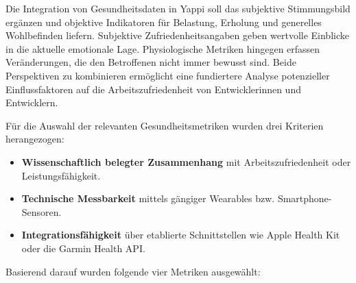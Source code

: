\documentclass[12pt,a4paper]{report}
\begin{document}
Die Integration von Gesundheitsdaten in Yappi soll das subjektive Stimmungsbild ergänzen und objektive Indikatoren für Belastung,
Erholung und generelles Wohlbefinden liefern. Subjektive Zufriedenheitsangaben geben wertvolle Einblicke in die aktuelle emotionale
Lage. Physiologische Metriken hingegen erfassen Veränderungen, die den Betroffenen nicht immer bewusst sind. Beide Perspektiven zu
kombinieren ermöglicht eine fundiertere Analyse potenzieller Einflussfaktoren auf die Arbeitszufriedenheit von Entwicklerinnen und
Entwicklern.

Für die Auswahl der relevanten Gesundheitsmetriken wurden drei Kriterien herangezogen:

\begin{itemize}
  \item \textbf{Wissenschaftlich belegter Zusammenhang} mit Arbeitszufriedenheit oder Leistungsfähigkeit.
  \item \textbf{Technische Messbarkeit} mittels gängiger Wearables bzw. Smartphone-Sensoren.
  \item \textbf{Integrationsfähigkeit} über etablierte Schnittstellen wie Apple Health Kit oder die Garmin Health API.
\end{itemize}

Basierend darauf wurden folgende vier Metriken ausgewählt:
\end{document}
